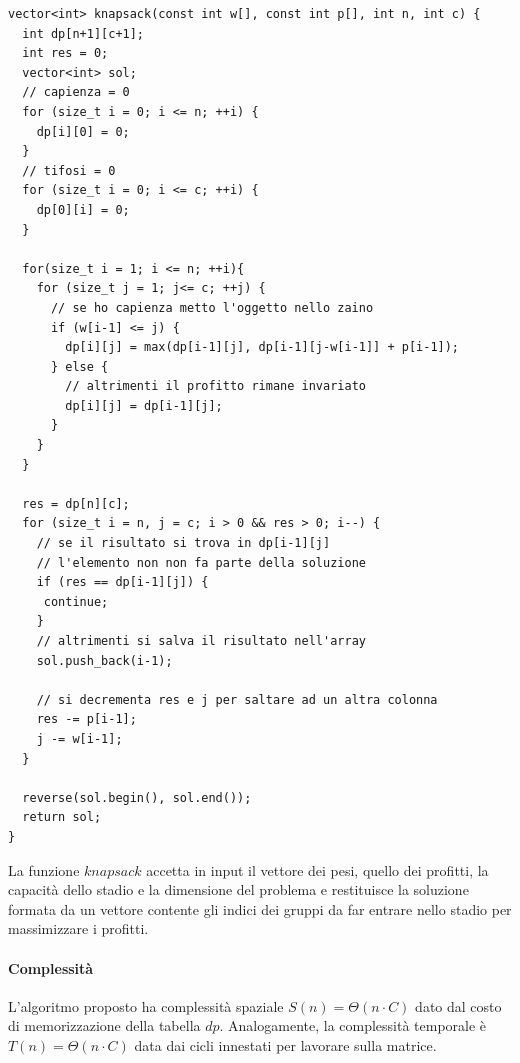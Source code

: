 \documentclass{article}
\begin{document}
\begin{lstlisting}[caption={Implementazione algoritmo dello zaino con ricostruzione della soluzione},captionpos=b]
vector<int> knapsack(const int w[], const int p[], int n, int c) {
  int dp[n+1][c+1];
  int res = 0;
  vector<int> sol;
  // capienza = 0
  for (size_t i = 0; i <= n; ++i) {
    dp[i][0] = 0;
  }
  // tifosi = 0
  for (size_t i = 0; i <= c; ++i) {
    dp[0][i] = 0;
  }

  for(size_t i = 1; i <= n; ++i){
    for (size_t j = 1; j<= c; ++j) {
      // se ho capienza metto l'oggetto nello zaino
      if (w[i-1] <= j) {
        dp[i][j] = max(dp[i-1][j], dp[i-1][j-w[i-1]] + p[i-1]);
      } else {
        // altrimenti il profitto rimane invariato
        dp[i][j] = dp[i-1][j];
      }
    }
  }

  res = dp[n][c];
  for (size_t i = n, j = c; i > 0 && res > 0; i--) {
    // se il risultato si trova in dp[i-1][j]
    // l'elemento non non fa parte della soluzione
    if (res == dp[i-1][j]) {
     continue;   
    } 
    // altrimenti si salva il risultato nell'array
    sol.push_back(i-1);
             
    // si decrementa res e j per saltare ad un altra colonna
    res -= p[i-1];
    j -= w[i-1];
  }

  reverse(sol.begin(), sol.end());
  return sol;
}

\end{lstlisting}

La funzione $knapsack$ accetta in input il vettore dei pesi, quello dei profitti, la capacità dello stadio e la dimensione del problema e restituisce la soluzione formata da un vettore contente gli indici dei gruppi da far entrare nello stadio per massimizzare i profitti.

\paragraph{Complessità}
L'algoritmo proposto ha complessità spaziale $S(n) = \Theta(n\cdot C)$ dato dal costo di memorizzazione della tabella $dp$. Analogamente, la complessità temporale è $T(n) = \Theta(n\cdot C)$ data dai cicli innestati per lavorare sulla matrice.
\end{document}
